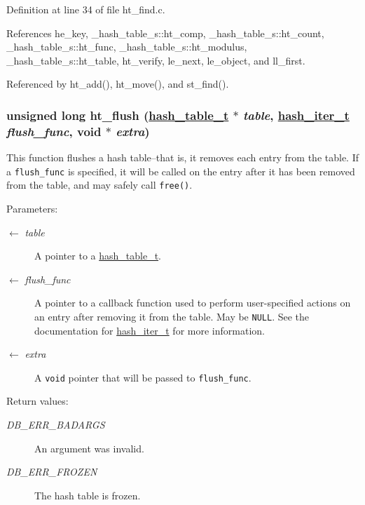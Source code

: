 Definition at line 34 of file ht\_\-find.c.

References he\_\-key, \_\-hash\_\-table\_\-s::ht\_\-comp, \_\-hash\_\-table\_\-s::ht\_\-count, \_\-hash\_\-table\_\-s::ht\_\-func, \_\-hash\_\-table\_\-s::ht\_\-modulus, \_\-hash\_\-table\_\-s::ht\_\-table, ht\_\-verify, le\_\-next, le\_\-object, and ll\_\-first.

Referenced by ht\_\-add(), ht\_\-move(), and st\_\-find().\hypertarget{group__dbprim__hash_ga16}{
\subsubsection[ht\_\-flush]{\setlength{\rightskip}{0pt plus 5cm}unsigned long ht\_\-flush (\hyperlink{struct__hash__table__s}{hash\_\-table\_\-t} $\ast$ {\em table}, \hyperlink{group__dbprim__hash_ga3}{hash\_\-iter\_\-t} {\em flush\_\-func}, void $\ast$ {\em extra})}}
\label{group__dbprim__hash_ga16}


This function flushes a hash table--that is, it removes each entry from the table. If a {\tt flush\_\-func} is specified, it will be called on the entry after it has been removed from the table, and may safely call {\tt free()}.

\begin{Desc}
\item[Parameters:]
\begin{description}
\item[\mbox{$\leftarrow$} {\em table}]A pointer to a \hyperlink{group__dbprim__hash_ga1}{hash\_\-table\_\-t}. \item[\mbox{$\leftarrow$} {\em flush\_\-func}]A pointer to a callback function used to perform user-specified actions on an entry after removing it from the table. May be {\tt NULL}. See the documentation for \hyperlink{group__dbprim__hash_ga3}{hash\_\-iter\_\-t} for more information. \item[\mbox{$\leftarrow$} {\em extra}]A {\tt void} pointer that will be passed to {\tt flush\_\-func}.\end{description}
\end{Desc}
\begin{Desc}
\item[Return values:]
\begin{description}
\item[{\em DB\_\-ERR\_\-BADARGS}]An argument was invalid. \item[{\em DB\_\-ERR\_\-FROZEN}]The hash table is frozen.\end{description}
\end{Desc}


